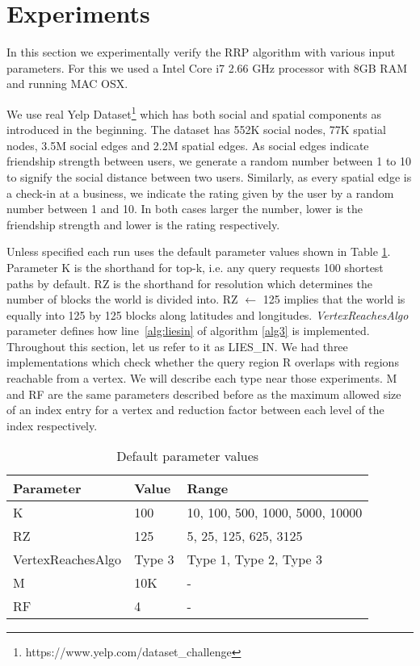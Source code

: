 \section{Experiments}
In this section we experimentally verify the RRP algorithm with various input parameters. For this we used a Intel Core i7 2.66 GHz processor with 8GB RAM and running MAC OSX. 

We use real Yelp Dataset\footnote{https://www.yelp.com/dataset\_challenge} which has both social and spatial components as introduced in the beginning. The dataset has 552K social nodes, 77K spatial nodes, 3.5M social edges and 2.2M spatial edges. As social edges indicate friendship strength between users, we generate a random number between 1 to 10 to signify the social distance between two users. Similarly, as every spatial edge is a check-in at a business, we indicate the rating given by the user by a random number between 1 and 10. In both cases larger the number, lower is the friendship strength and lower is the rating respectively. 

Unless specified each run uses the default parameter values shown in Table \ref{tab:default-param}. Parameter K is the shorthand for top-k, i.e. any query requests 100 shortest paths by default. RZ is the shorthand for resolution which determines the number of blocks the world is divided into. RZ $\gets$ 125 implies that the world is equally into 125 by 125 blocks along latitudes and longitudes. \textit{VertexReachesAlgo} parameter defines how line~\ref{alg:liesin} of algorithm \ref{alg3} is implemented. Throughout this section, let us refer to it as LIES\_IN. We had three implementations which check whether the query region R overlaps with regions reachable from a vertex. We will describe each type near those experiments. M and RF are the same parameters described before as the maximum allowed size of an index entry for a vertex and reduction factor between each level of the index respectively.

\begin{table}[h]
	\caption{Default parameter values}
	\label{tab:default-param}
	\begin{center}
		\renewcommand{\arraystretch}{1.25}
		\begin{tabular}{ l | l | l }
			\hline
			Parameter & Value & Range \\ \hline
			\hline
			K & 100 & 10, 100, 500, 1000, 5000, 10000 \\
			RZ & 125 & 5, 25, 125, 625, 3125 \\
			VertexReachesAlgo & Type 3 & Type 1, Type 2, Type 3 \\
			M & 10K & - \\
			RF & 4 & - \\
			\hline
		\end{tabular}
	\end{center}
\end{table}

